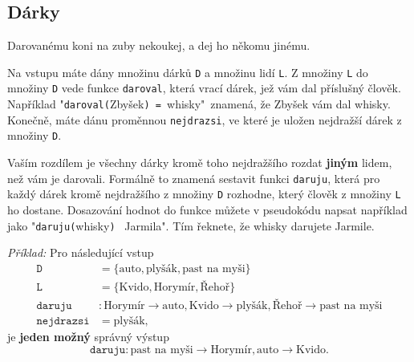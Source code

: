 \documentclass[a4paper,11pt]{article}
\begin{document}
\clearpage

\subsection*{Dárky}

Darovanému koni na zuby nekoukej, a dej ho někomu jinému.

Na vstupu máte dány množinu dárků \texttt{D} a množinu lidí \texttt{L}. Z
množiny \texttt{L} do množiny \texttt{D} vede funkce \texttt{daroval}, která
vrací dárek, jež vám dal příslušný člověk. Například
"\texttt{daroval(}Zbyšek\texttt{) = }whisky"~znamená, že Zbyšek vám dal whisky.
Konečně, máte dánu proměnnou \texttt{nejdrazsi}, ve které je uložen nejdražší
dárek z množiny \texttt{D}.

Vaším rozdílem je všechny dárky kromě toho nejdražšího rozdat \textbf{jiným}
lidem, než vám je darovali. Formálně to znamená sestavit funkci \texttt{daruju},
která pro každý dárek kromě nejdražšího z množiny \texttt{D} rozhodne, který
člověk z množiny \texttt{L} ho dostane. Dosazování hodnot do funkce můžete v
pseudokódu napsat například jako "\texttt{daruju(}whisky\texttt{)}
\textleftarrow~Jarmila". Tím řeknete, že whisky darujete Jarmile.

\emph{Příklad:} Pro následující vstup
\begin{align*}
 \mathtt{D} &= \{\text{auto}, \text{plyšák}, \text{past na myši}\}\\
 \mathtt{L} &= \{\text{Kvido}, \text{Horymír}, \text{Řehoř}\}\\
 \mathtt{daruju} & : \text{Horymír} \to \text{auto}, \text{Kvido} \to
 \text{plyšák}, \text{Řehoř} \to \text{past na myši}\\
 \mathtt{nejdrazsi} &= \text{plyšák},
\end{align*}
je \textbf{jeden možný} správný výstup
\[
 \mathtt{daruju}: \text{past na myši} \to \text{Horymír}, \text{auto} \to
 \text{Kvido}.
\]
\end{document}
